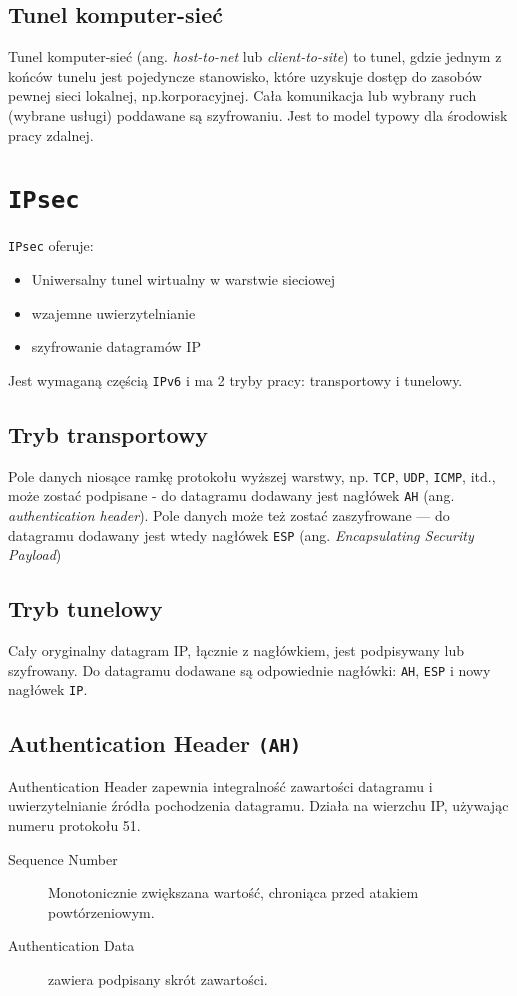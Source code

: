 \documentclass[a4paper]{article}
\begin{document}
\subsection{Tunel komputer-sieć}
Tunel komputer-sieć (ang. \emph{host-to-net} lub \emph{client-to-site}) to tunel, gdzie jednym
z końców tunelu jest pojedyncze stanowisko, które uzyskuje dostęp do zasobów pewnej sieci
lokalnej, np.\@ korporacyjnej. Cała komunikacja lub wybrany ruch (wybrane usługi) poddawane są
szyfrowaniu. Jest to model typowy dla środowisk pracy zdalnej.
\section{\tt IPsec}
{\tt IPsec} oferuje:
\begin{itemize}
  \item Uniwersalny tunel wirtualny w warstwie sieciowej
  \item wzajemne uwierzytelnianie
  \item szyfrowanie datagramów IP
\end{itemize}
Jest wymaganą częścią {\tt IPv6} i ma 2 tryby pracy: transportowy i tunelowy.
\subsection{Tryb transportowy}
Pole danych niosące ramkę protokołu wyższej warstwy, np. {\tt TCP}, {\tt UDP}, {\tt ICMP}, itd.,
może zostać podpisane - do datagramu dodawany jest nagłówek {\tt AH}
(ang. \emph{authentication header}). Pole danych może też zostać
zaszyfrowane --- do datagramu dodawany jest wtedy nagłówek {\tt ESP}
(ang. \emph{Encapsulating Security Payload})
\subsection{Tryb tunelowy}
Cały oryginalny datagram IP, łącznie z nagłówkiem, jest podpisywany lub szyfrowany. Do datagramu
dodawane są odpowiednie nagłówki: {\tt AH}, {\tt ESP} i nowy nagłówek {\tt IP}.
\pagebreak
\subsection{Authentication Header {\tt (AH)}}
Authentication Header zapewnia integralność zawartości datagramu i uwierzytelnianie źródła
pochodzenia datagramu. Działa na wierzchu IP, używając numeru protokołu 51.

\begin{description}
  \item[Sequence Number] Monotonicznie zwiększana wartość, chroniąca przed atakiem powtórzeniowym.
  \item[Authentication Data] zawiera podpisany skrót zawartości.
\end{description}
\end{document}
